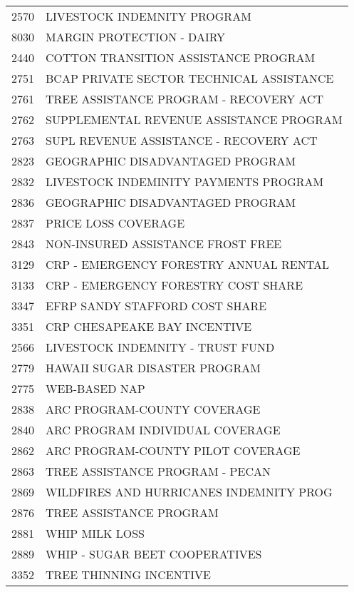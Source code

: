 \begin{longtable}{ll}
2570 & LIVESTOCK INDEMNITY PROGRAM \\
\cline{1-2}
8030 & MARGIN PROTECTION  - DAIRY \\
\cline{1-2}
2440 & COTTON TRANSITION ASSISTANCE PROGRAM \\
\cline{1-2}
2751 & BCAP PRIVATE SECTOR TECHNICAL ASSISTANCE \\
\cline{1-2}
2761 & TREE ASSISTANCE PROGRAM - RECOVERY ACT \\
\cline{1-2}
2762 & SUPPLEMENTAL REVENUE ASSISTANCE PROGRAM \\
\cline{1-2}
2763 & SUPL REVENUE ASSISTANCE - RECOVERY ACT \\
\cline{1-2}
2823 & GEOGRAPHIC DISADVANTAGED PROGRAM \\
\cline{1-2}
2832 & LIVESTOCK INDEMINITY PAYMENTS PROGRAM \\
\cline{1-2}
2836 & GEOGRAPHIC DISADVANTAGED PROGRAM \\
\cline{1-2}
2837 & PRICE LOSS COVERAGE \\
\cline{1-2}
2843 & NON-INSURED ASSISTANCE FROST FREE \\
\cline{1-2}
3129 & CRP - EMERGENCY FORESTRY ANNUAL RENTAL \\
\cline{1-2}
3133 & CRP - EMERGENCY FORESTRY COST SHARE \\
\cline{1-2}
3347 & EFRP SANDY STAFFORD COST SHARE \\
\cline{1-2}
3351 & CRP CHESAPEAKE BAY INCENTIVE \\
\cline{1-2}
2566 & LIVESTOCK INDEMNITY - TRUST FUND \\
\cline{1-2}
2779 & HAWAII SUGAR DISASTER PROGRAM \\
\cline{1-2}
2775 & WEB-BASED NAP \\
\cline{1-2}
2838 & ARC PROGRAM-COUNTY COVERAGE \\
\cline{1-2}
2840 & ARC PROGRAM INDIVIDUAL COVERAGE \\
\cline{1-2}
2862 & ARC PROGRAM-COUNTY PILOT COVERAGE \\
\cline{1-2}
2863 & TREE ASSISTANCE PROGRAM - PECAN \\
\cline{1-2}
2869 & WILDFIRES AND HURRICANES INDEMNITY PROG \\
\cline{1-2}
2876 & TREE ASSISTANCE PROGRAM \\
\cline{1-2}
2881 & WHIP MILK LOSS \\
\cline{1-2}
2889 & WHIP - SUGAR BEET COOPERATIVES \\
\cline{1-2}
3352 & TREE THINNING INCENTIVE \\

\end{longtable}
